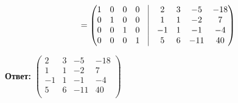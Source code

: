 \documentclass[a4paper,12pt]{article}
\begin{document}
\[
=
\begin{pmatrix}
1 & 0 & 0& 0 & \vrule & 2& 3& -5 & -18\\
0 & 1&0& 0& \vrule & 1& 1  & -2&7\\
0 & 0& 1& 0 & \vrule & -1& 1 & -1& -4\\
0 & 0& 0& 1& \vrule & 5& 6 & -11 & 40\\
\end{pmatrix} 
\]
\begin{large}
\begin{center}
\textbf{Ответ:} $\begin{pmatrix}
 2& 3& -5 & -18\\
 1& 1  & -2&7\\
-1& 1 & -1& -4\\
 5& 6 & -11 & 40\\
\end{pmatrix} $
\end{center}
\end{large}
\end{document}
